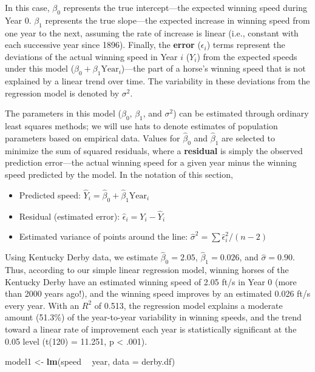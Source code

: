 \documentclass[
]{krantz}
\newenvironment{Shaded}{\begin{snugshade}}{\end{snugshade}}
\newcommand{\DataTypeTok}[1]{\textcolor[rgb]{0.27,0.27,0.27}{#1}}
\newcommand{\KeywordTok}[1]{\textcolor[rgb]{0.27,0.27,0.27}{\textbf{#1}}}
\newcommand{\NormalTok}[1]{#1}
\newcommand{\OperatorTok}[1]{\textcolor[rgb]{0.43,0.43,0.43}{\textbf{#1}}}
\newcommand{\StringTok}[1]{\textcolor[rgb]{0.5,0.5,0.5}{#1}}
\providecommand{\tightlist}{%
  \setlength{\itemsep}{0pt}\setlength{\parskip}{0pt}}
\begin{document}
In this case, \(\beta_{0}\) represents the true intercept---the expected winning speed during Year 0. \(\beta_{1}\) represents the true slope---the expected increase in winning speed from one year to the next, assuming the rate of increase is linear (i.e., constant with each successive year since 1896). Finally, the \textbf{error} (\(\epsilon_{i}\))  terms represent the deviations of the actual winning speed in Year \(i\) (\(Y_i\)) from the expected speeds under this model (\(\beta_{0}+\beta_{1}\textrm{Year}_{i}\))---the part of a horse's winning speed that is not explained by a linear trend over time. The variability in these deviations from the regression model is denoted by \(\sigma^2\).

The parameters in this model (\(\beta_{0}\), \(\beta_{1}\), and \(\sigma^2\)) can be estimated through ordinary least squares methods; we will use hats to denote estimates of population parameters based on empirical data. Values for \(\hat{\beta}_{0}\) and \(\hat{\beta}_{1}\) are selected to minimize the sum of squared residuals, where a \textbf{residual}  is simply the observed prediction error---the actual winning speed for a given year minus the winning speed predicted by the model. In the notation of this section,

\begin{itemize}
\tightlist
\item
  Predicted speed: \(\hat{Y}_{i}=\hat{\beta}_{0}+\hat{\beta}_{1}\textrm{Year}_{i}\)
\item
  Residual (estimated error): \(\hat{\epsilon}_{i}=Y_{i} - \hat{Y}_{i}\)
\item
  Estimated variance of points around the line: \(\hat{\sigma}^2 = \sum \hat{\epsilon}^2_{i} / (n-2)\)
\end{itemize}

Using Kentucky Derby data, we estimate \(\hat{\beta}_{0}=2.05\), \(\hat{\beta}_{1}=0.026\), and \(\hat{\sigma}=0.90\). Thus, according to our simple linear regression model, winning horses of the Kentucky Derby have an estimated winning speed of 2.05 ft/s in Year 0 (more than 2000 years ago!), and the winning speed improves by an estimated 0.026 ft/s every year. With an \(R^2\) of 0.513, the regression model explains a moderate amount (51.3\%) of the year-to-year variability in winning speeds, and the trend toward a linear rate of improvement each year is statistically significant at the 0.05 level (t(120) = 11.251, p \textless{} .001).

\begin{Shaded}
\begin{Highlighting}[]
\NormalTok{model1 <-}\StringTok{ }\KeywordTok{lm}\NormalTok{(speed }\OperatorTok{~}\StringTok{ }\NormalTok{year, }\DataTypeTok{data =}\NormalTok{ derby.df)}
\end{Highlighting}
\end{Shaded}
\end{document}
